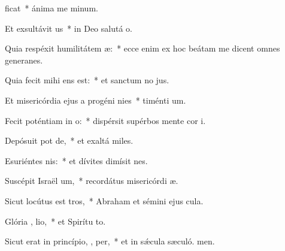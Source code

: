 \item {}ficat~* ánima me minum.
\item Et exsultávit  us~* in Deo salutá o.
\item Quia respéxit humilitátem  æ:~* ecce enim ex hoc beátam me dicent omnes generanes.
\item Quia fecit mihi   ens est:~* et sanctum no jus.
\item Et misericórdia ejus a progéni  nies~* timénti um.
\item Fecit poténtiam in  o:~* dispérsit supérbos mente cor i.
\item Depósuit pot  de,~* et exaltá miles.
\item Esuriéntes  nis:~* et dívites dimísit nes.
\item Suscépit Israël  um,~* recordátus misericórdi æ.
\item Sicut locútus est   tros,~* Abraham et sémini ejus  cula.
\item Glória ,  lio,~* et Spirítu to.
\item Sicut erat in princípio,  ,  per,~* et in sǽcula sæculó. men.
